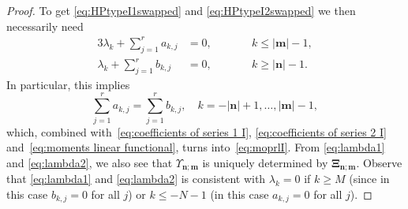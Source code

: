 \documentclass[reqno,centertags,11pt,draft]{amsart}
\begin{document}
\begin{proof}
    

    To get \eqref{eq:HPtypeI1swapped} and \eqref{eq:HPtypeI2swapped} we then necessarily need
    \begin{alignat}{3}
        \label{eq:lambda1}
        \lambda_k + \sum_{j=1}^r a_{k,j} & = 0, \qquad && k\le |\bm{m}|-1,
        \\
        \label{eq:lambda2}
        \lambda_k + \sum_{j=1}^r b_{k,j} & = 0, \qquad && k\ge |\bm{n}|-1.
    \end{alignat}
    In particular, this implies
    \begin{equation}
        \label{eq:PadeToOrthoEq I}
          \sum_{j=1}^r a_{k,j} = \sum_{j=1}^r b_{k,j},  \quad k = -|\bm{n}|+1,\dots,|\bm{m}|-1,
    \end{equation}
    which, combined with~\eqref{eq:coefficients of series 1 I},  \eqref{eq:coefficients of series 2 I} and~\eqref{eq:moments linear functional}, turns into~\eqref{eq:moprlI}. From \eqref{eq:lambda1} and \eqref{eq:lambda2}, we also see that $\Upsilon_{\bm{n};\bm{m}}$ is uniquely determined by $\bm{\Xi}_{\bm{n};\bm{m}}$. Observe that \eqref{eq:lambda1} and \eqref{eq:lambda2} is consistent with $\lambda_{k} = 0$ if $k \ge M$ (since in this case $b_{k,j}=0$ for all $j$) or $k \le -N -1$ (in this case $a_{k,j}=0$ for all $j$).
    

\end{proof}
\end{document}
